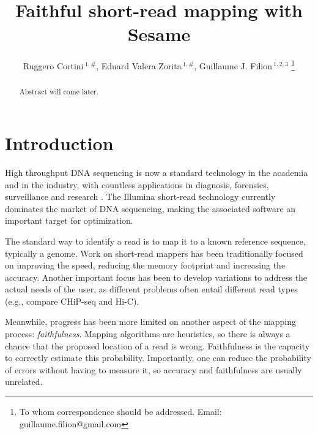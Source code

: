 \documentclass[a4,center,fleqn]{NAR}
\begin{document}
\title{Faithful short-read mapping with Sesame}

\author{%
Ruggero Cortini\,$^{1,\text{\#}}$,
Eduard Valera Zorita\,$^{1,\text{\#}}$,
Guillaume J. Filion\,$^{1,2,3}$
\footnote{To whom correspondence should be addressed.
Email: guillaume.filion@gmail.com}}

\address{%
$^{1}$Center for Genomic Regulation (CRG), The Barcelona Institute
of Science and Technology, Dr. Aiguader 88, Barcelona 08003, Spain;
$^{2}$University Pompeu Fabra (UPF), Barcelona, Spain;
$^{3}$present address: Department of Biological Sciences, University
of Toronto Scarborough, Toronto, ON, Canada; $^{\text{\#}}$ equal
contributions.}


\maketitle

\begin{abstract}
Abstract will come later.
\end{abstract}


\section{Introduction}

High throughput DNA sequencing is now a standard technology in the
academia and in the industry, with countless applications in diagnosis,
forensics, surveillance and research \cite{1}. The Illumina short-read
technology currently dominates the market of DNA sequencing, making the
associated software an important target for optimization.

The standard way to identify a read is to map it to a known reference
sequence, typically a genome. Work on short-read mappers has been
traditionally focused on improving the speed, reducing the memory
footprint and increasing the accuracy. Another important focus has been to
develop variations to address the actual needs of the user, as different
problems often entail different read types (e.g., compare CHiP-seq and
Hi-C).

Meanwhile, progress has been more limited on another aspect of the mapping
process: \emph{faithfulness}. Mapping algorithms are heuristics, so there
is always a chance that the proposed location of a read is wrong.
Faithfulness is the capacity to correctly estimate this probability.
Importantly, one can reduce the probability of errors without having to
measure it, so accuracy and faithfulness are usually unrelated.
\end{document}
